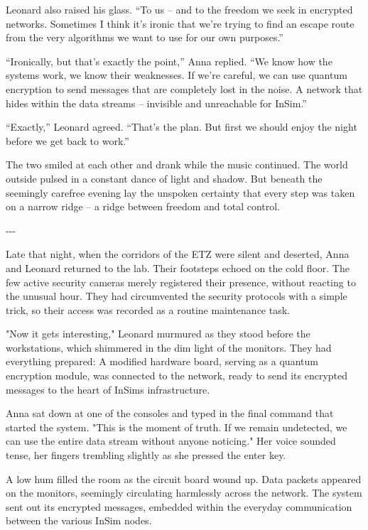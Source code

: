 \documentclass[
]{article}
\begin{document}
Leonard also raised his glass. ``To us -- and to the freedom we seek in encrypted networks. Sometimes I think it's ironic that we're trying to find an escape route from the very algorithms we want to use for our own purposes.''

``Ironically, but that's exactly the point,'' Anna replied. ``We know how the systems work, we know their weaknesses. If we're careful, we can use quantum encryption to send messages that are completely lost in the noise. A network that hides within the data streams -- invisible and unreachable for InSim.''

``Exactly,'' Leonard agreed. ``That's the plan. But first we should enjoy the night before we get back to work.''

The two smiled at each other and drank while the music continued. The world outside pulsed in a constant dance of light and shadow. But beneath the seemingly carefree evening lay the unspoken certainty that every step was taken on a narrow ridge -- a ridge between freedom and total control.

-\/-\/-

Late that night, when the corridors of the ETZ were silent and deserted, Anna and Leonard returned to the lab. Their footsteps echoed on the cold floor. The few active security cameras merely registered their presence, without reacting to the unusual hour. They had circumvented the security protocols with a simple trick, so their access was recorded as a routine maintenance task.

"Now it gets interesting," Leonard murmured as they stood before the workstations, which shimmered in the dim light of the monitors. They had everything prepared: A modified hardware board, serving as a quantum encryption module, was connected to the network, ready to send its encrypted messages to the heart of InSim\textquotesingle s infrastructure.

Anna sat down at one of the consoles and typed in the final command that started the system. "This is the moment of truth. If we remain undetected, we can use the entire data stream without anyone noticing." Her voice sounded tense, her fingers trembling slightly as she pressed the enter key.

A low hum filled the room as the circuit board wound up. Data packets appeared on the monitors, seemingly circulating harmlessly across the network. The system sent out its encrypted messages, embedded within the everyday communication between the various InSim nodes.
\end{document}
